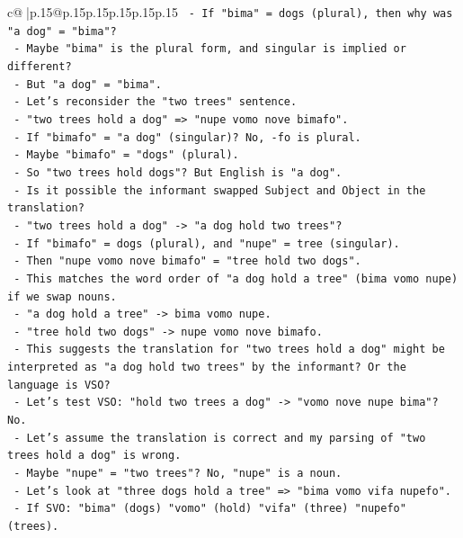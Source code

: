 \documentclass{article}
\begin{document}
{\begin{supertabular}{c@{$\;$}|p{.15\linewidth}@{}p{.15\linewidth}p{.15\linewidth}p{.15\linewidth}p{.15\linewidth}p{.15\linewidth}}
{{{\texttt{           {-} If "bima" = dogs (plural), then why was "a dog" = "bima"?} \\
\texttt{           {-} Maybe "bima" is the plural form, and singular is implied or different?} \\
\texttt{           {-} But "a dog" = "bima".} \\
\texttt{           {-} Let's reconsider the "two trees" sentence.} \\
\texttt{           {-} "two trees hold a dog" => "nupe vomo nove bimafo".} \\
\texttt{           {-} If "bimafo" = "a dog" (singular)? No, {-}fo is plural.} \\
\texttt{           {-} Maybe "bimafo" = "dogs" (plural).} \\
\texttt{           {-} So "two trees hold dogs"? But English is "a dog".} \\
\texttt{           {-} Is it possible the informant swapped Subject and Object in the translation?} \\
\texttt{           {-} "two trees hold a dog" {-}> "a dog hold two trees"?} \\
\texttt{           {-} If "bimafo" = dogs (plural), and "nupe" = tree (singular).} \\
\texttt{           {-} Then "nupe vomo nove bimafo" = "tree hold two dogs".} \\
\texttt{           {-} This matches the word order of "a dog hold a tree" (bima vomo nupe) if we swap nouns.} \\
\texttt{           {-} "a dog hold a tree" {-}> bima vomo nupe.} \\
\texttt{           {-} "tree hold two dogs" {-}> nupe vomo nove bimafo.} \\
\texttt{           {-} This suggests the translation for "two trees hold a dog" might be interpreted as "a dog hold two trees" by the informant? Or the language is VSO?} \\
\texttt{           {-} Let's test VSO: "hold two trees a dog" {-}> "vomo nove nupe bima"? No.} \\
\texttt{           {-} Let's assume the translation is correct and my parsing of "two trees hold a dog" is wrong.} \\
\texttt{           {-} Maybe "nupe" = "two trees"? No, "nupe" is a noun.} \\
\texttt{           {-} Let's look at "three dogs hold a tree" => "bima vomo vifa nupefo".} \\
\texttt{           {-} If SVO: "bima" (dogs) "vomo" (hold) "vifa" (three) "nupefo" (trees).} \\
}}}
\end{supertabular}}
\end{document}
